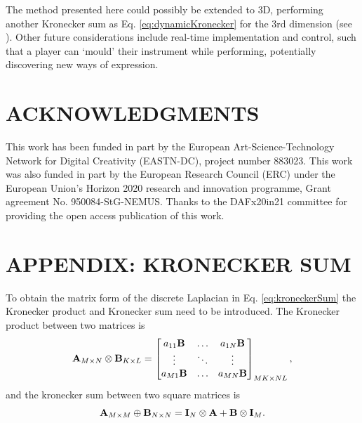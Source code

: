 \documentclass[fleqn]{jaes}
\begin{document}
The method presented here could possibly be extended to 3D, performing another Kronecker sum as Eq. \eqref{eq:dynamicKronecker} for the 3rd dimension (see \cite{Hamilton2016}). Other future considerations include real-time implementation and control, such that a player can `mould' their instrument while performing, potentially discovering new ways of expression.

\section{ACKNOWLEDGMENTS}
This  work  has  been  funded  in  part  by  the European Art-Science-Technology Network for Digital Creativity (EASTN-DC), project number 883023. This work was also funded in part by the European Research Council (ERC) under the European Union’s Horizon 2020 research and innovation programme, Grant agreement No. 950084-StG-NEMUS. Thanks to the DAFx20in21 committee for providing the open access publication of this work.




\appendix
\section*{APPENDIX: KRONECKER SUM}\label{app:kronecker}
To obtain the matrix form of the discrete Laplacian in Eq. \eqref{eq:kroneckerSum} the Kronecker product and Kronecker sum need to be introduced. The Kronecker product between two matrices is \cite{Horn1991}
\begin{equation}
    \mathbf{A}_{M\times N} \otimes \mathbf{B}_{K\times L} = \begin{bmatrix}
        a_{11}\mathbf{B} & \hdots & a_{1N}\mathbf{B}\\
        \vdots & \ddots & \vdots\\
        a_{M1}\mathbf{B} & \hdots & a_{MN}\mathbf{B}\\
    \end{bmatrix}_{MK \times NL},
\end{equation}
and the kronecker sum between two square matrices is \cite{Hamilton2016}
\begin{equation}\label{eq:kronSum}
    \A_{M \times M} \oplus \B_{N \times N} = \I_N\otimes \A + \B \otimes\I_M.
\end{equation}
\end{document}
